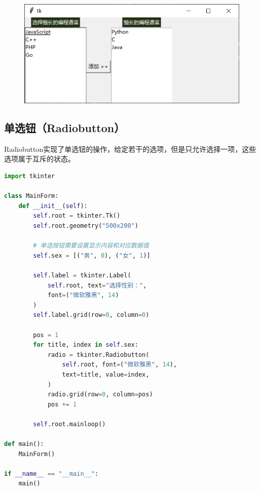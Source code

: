 \begin{tcolorbox}
	\begin{figure}[H]
		\centering
		\includegraphics[]{img/C13/13-4/1.png}
	\end{figure}
\end{tcolorbox}

\vspace{0.5cm}

\subsection{单选钮（Radiobutton）}

Radiobutton实现了单选钮的操作，给定若干的选项，但是只允许选择一项，这些选项属于互斥的状态。\\


\begin{lstlisting}[language=Python]
import tkinter

class MainForm:
    def __init__(self):
        self.root = tkinter.Tk()
        self.root.geometry("500x200")

        # 单选按钮需要设置显示内容和对应数据值
        self.sex = [("男", 0), ("女", 1)]

        self.label = tkinter.Label(
            self.root, text="选择性别：",
            font=("微软雅黑", 14)
        )
        self.label.grid(row=0, column=0)

        pos = 1
        for title, index in self.sex:
            radio = tkinter.Radiobutton(
                self.root, font=("微软雅黑", 14),
                text=title, value=index,
            )
            radio.grid(row=0, column=pos)
            pos += 1

        self.root.mainloop()

def main():
    MainForm()

if __name__ == "__main__":
    main()
\end{lstlisting}

